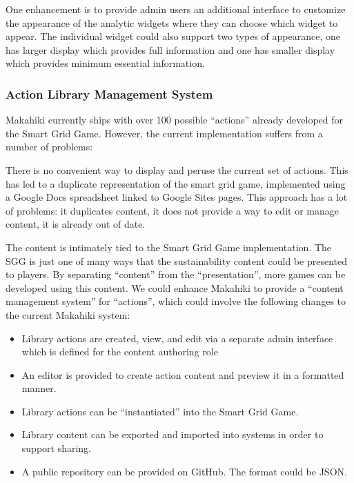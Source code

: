 One enhancement is to provide admin users an additional interface to customize the appearance of the analytic widgets where they can choose which widget to appear. The individual widget could also support two types of appearance, one has larger display which provides full information and one has smaller display which provides minimum essential information. 

\subsubsection{Action Library Management System}
Makahiki currently ships with over 100 possible  ``actions'' already developed for the Smart Grid Game. However, the current implementation suffers from a number of problems:

There is no convenient way to display and peruse the current set of actions. This has led to a duplicate representation of the smart grid game, implemented using a Google Docs spreadsheet linked to Google Sites pages. This approach has a lot of problems: it duplicates content, it does not provide a way to edit or manage content, it is already out of date.

The content is intimately tied to the Smart Grid Game implementation. The SGG is just one of many ways that the sustainability content could be presented to players. By separating ``content'' from the ``presentation'', more games can be developed using this content. We could enhance Makahiki to provide a ``content management system'' for ``actions'', which could involve the following changes to the current Makahiki system:
\begin{itemize}
\item Library actions are created, view, and edit via a separate admin interface which is defined for the content authoring role
\item An editor is provided to create action content and preview it in a formatted manner.
\item Library actions can be ``instantiated'' into the Smart Grid Game. 
\item Library content can be exported and imported into systems in order to support sharing. 
\item A public repository can be provided on GitHub. The format could be JSON.
\end{itemize}


